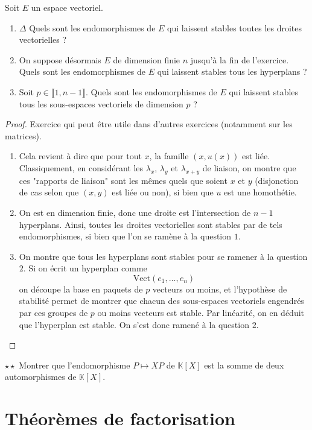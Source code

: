 \documentclass[french,a4paper]{article}
\newcommand{\K}{\mathbb{K}}
\theoremstyle{plain}
\theoremstyle{definition}
\theoremstyle{remark}
\begin{document}
\begin{ex}[Moulin.EV.46]{}
	Soit $E$ un espace vectoriel.
	\begin{enumerate}
		\item $\Delta$ Quels sont les endomorphismes de $E$ qui laissent stables toutes les droites vectorielles ?
		\item On suppose désormais $E$ de dimension finie $n$ jusqu'à la fin de l'exercice. Quels sont les endomorphismes de $E$ qui laissent stables tous les hyperplans ?
		\item Soit $p\in\llbracket1,n-1\rrbracket$. Quels sont les endomorphismes de $E$ qui laissent stables tous les sous-espaces vectoriels de dimension $p$ ?
	\end{enumerate}
\end{ex}
\begin{proof}
	Exercice qui peut être utile dans d'autres exercices (notamment sur les matrices).
	\begin{enumerate}
		\item Cela revient à dire que pour tout $x$, la famille $(x,u(x))$ est liée. Classiquement, en considérant les $\lambda_x$, $\lambda_y$ et $\lambda_{x+y}$ de liaison, on montre que ces "rapports de liaison" sont les mêmes quels que soient $x$ et $y$ (disjonction de cas selon que $(x,y)$ est liée ou non), si bien que $u$ est une homothétie.
		\item On est en dimension finie, donc une droite est l'intersection de $n-1$ hyperplans. Ainsi, toutes les droites vectorielles sont stables par de tels endomorphismes, si bien que l'on se ramène à la question $1$.
		\item On montre que tous les hyperplans sont stables pour se ramener à la question $2$. Si on écrit un hyperplan comme $$\text{Vect}(e_1,\ldots,e_n)$$ on découpe la base en paquets de $p$ vecteurs ou moins, et l'hypothèse de stabilité permet de montrer que chacun des sous-espaces vectoriels engendrés par ces groupes de $p$ ou moins vecteurs est stable. Par linéarité, on en déduit que l'hyperplan est stable. On s'est donc ramené à la question $2$.
	\end{enumerate}
\end{proof}

\begin{ex}[Moulin.EV.47]{$\star\star$}
	Montrer que l'endomorphisme $P\mapsto XP$ de $\K[X]$ est la somme de deux automorphismes de $\K[X]$.
\end{ex}

\section{Théorèmes de factorisation}
\end{document}
